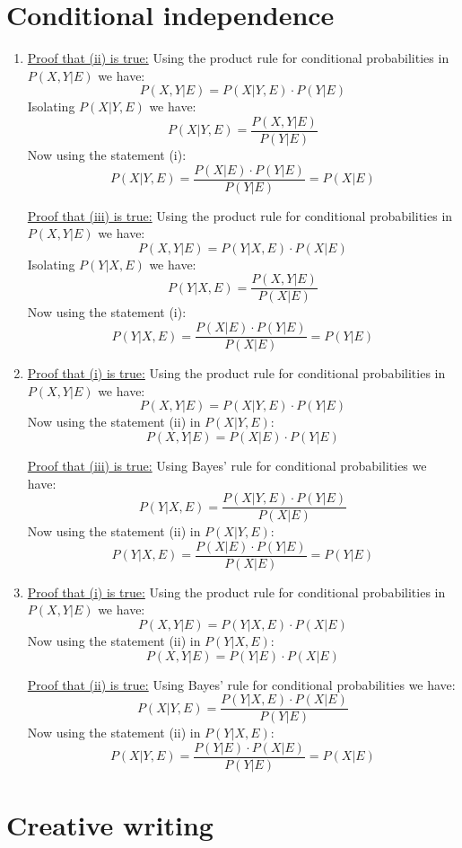 \documentclass{article}
\begin{document}
\section{Conditional independence}

\begin{enumerate}[label=(\roman*)]
\item
\underline{Proof that (ii) is true:} \bigbreak
Using the product rule for conditional probabilities in $P(X,Y|E)$ we have:
$$P(X,Y|E)=P(X|Y,E) \cdot P(Y|E)$$
Isolating $P(X|Y,E)$ we have:
$$P(X|Y,E) = \frac{P(X,Y|E)}{P(Y|E)}$$
Now using the statement (i):
$$P(X|Y,E) = \frac{P(X|E) \cdot P(Y|E)}{P(Y|E)}=P(X|E)$$

\underline{Proof that (iii) is true:}\bigbreak
Using the product rule for conditional probabilities in $P(X,Y|E)$ we have:
$$P(X,Y|E)=P(Y|X,E) \cdot P(X|E)$$
Isolating $P(Y|X,E)$ we have:
$$P(Y|X,E) = \frac{P(X,Y|E)}{P(X|E)}$$
Now using the statement (i):
$$P(Y|X,E) = \frac{P(X|E) \cdot P(Y|E)}{P(X|E)}=P(Y|E)$$

\item
\underline{Proof that (i) is true:} \bigbreak
Using the product rule for conditional probabilities in $P(X,Y|E)$ we have:
$$P(X,Y|E)=P(X|Y,E) \cdot P(Y|E)$$
Now using the statement (ii) in $P(X|Y,E)$:
$$P(X,Y|E) = P(X|E) \cdot P(Y|E)$$

\underline{Proof that (iii) is true:}\bigbreak
Using Bayes' rule for conditional probabilities we have:
$$P(Y|X,E)=\frac{P(X|Y,E) \cdot P(Y|E)}{P(X|E)} $$
Now using the statement (ii) in $P(X|Y,E)$:
$$P(Y|X,E) = \frac{P(X|E) \cdot P(Y|E)}{P(X|E)}=P(Y|E)$$

\item
\underline{Proof that (i) is true:} \bigbreak
Using the product rule for conditional probabilities in $P(X,Y|E)$ we have:
$$P(X,Y|E)=P(Y|X,E) \cdot P(X|E)$$
Now using the statement (ii) in $P(Y|X,E)$:
$$P(X,Y|E) = P(Y|E) \cdot P(X|E)$$

\underline{Proof that (ii) is true:}\bigbreak
Using Bayes' rule for conditional probabilities we have:
$$P(X|Y,E)=\frac{P(Y|X,E) \cdot P(X|E)}{P(Y|E)} $$
Now using the statement (ii) in $P(Y|X,E)$:
$$P(X|Y,E) = \frac{P(Y|E) \cdot P(X|E)}{P(Y|E)}=P(X|E)$$
\end{enumerate}

\section{Creative writing}
\end{document}
